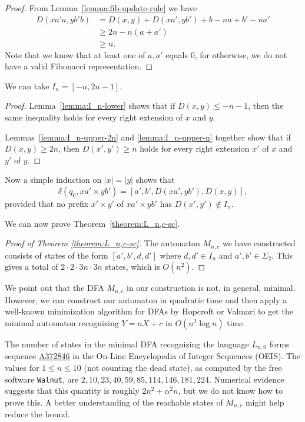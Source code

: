 \documentclass[12pt,reqno]{article}
\newcommand{\seqnum}[1]{\href{https://oeis.org/#1}{\rm \underline{#1}}}
\begin{document}
\begin{proof}
From Lemma~\ref{lemma:fib-update-rule} we have
\begin{align*}
D(xa'a, yb'b) &= D(x,y) + D(xa',yb') + b-na + b'-na' \\
&\geq 2n -n(a + a') \\
& \geq n.
\end{align*}
Note that we know
that at least one of $a, a'$ equals $0$, for otherwise,
we do not have a valid Fibonacci representation.
\end{proof}

\begin{theorem} \label{theorem:I_n}
We can take $I_n = [-n,2n-1]$.
\end{theorem}
\begin{proof}
Lemma~\ref{lemma:I_n-lower} shows that if $D(x,y) \leq -n-1$,
then the same inequality holds for every right extension
of $x$ and $y$.  

Lemmas~\ref{lemma:I_n-upper-2n} and \ref{lemma:I_n-upper-n} together show
that if $D(x,y) \geq 2n$, then $D(x',y') \geq n$
holds for every right extension $x'$ of $x$ and
$y'$ of $y$.
\end{proof}

Now a simple induction on
$|x| = |y|$ shows that 
$$\delta(q_0, xa' \times yb') = 
[a', b', D(xa',yb'), D(x,y)],$$
provided that
no prefix $x' \times y'$ of $xa' \times yb'$ has $D(x', y') \not\in I_n$.

We can now prove Theorem~\ref{theorem:L_n,c-sc}.
\begin{proof}[Proof of Theorem \ref{theorem:L_n,c-sc}]
The automaton $M_{n,c}$ we have constructed consists of
states of the form
$[a',b',d, d']$ where $d, d' \in I_n$ and
$a', b' \in \Sigma_2$.  This gives a total
of $2\cdot2\cdot3n \cdot 3n$ states,
which is $O(n^2)$.
\end{proof}

\begin{remark}
We point out that the DFA $M_{n,c}$ in our construction is not, in general,
minimal.  However, we can construct our automaton in quadratic time and then apply a well-known minimization algorithm for
DFAs by Hopcroft \cite{hopcroft_introduction_1979} or Valmari \cite{valmari_fast_2012} to get the minimal automaton
recognizing $Y=nX+c$ in $O(n^2 \log n)$ time.

The number of states in the minimal DFA recognizing the language
$L_{n,0}$ forms sequence \seqnum{A372846} in the
On-Line Encyclopedia of Integer Sequences (OEIS).   The values
for $1 \leq n \leq 10$ (not counting the dead state), as
computed by the free software {\tt Walnut}, are
$2, 10, 23, 40, 59, 85, 114, 146, 181, 224 $.
Numerical evidence suggests that this quantity is roughly
$2n^2 + \alpha^2 n$, but we do not know how to prove this.  A better understanding of the reachable states of $M_{n,c}$ might help reduce the bound.
\end{remark}
\end{document}
